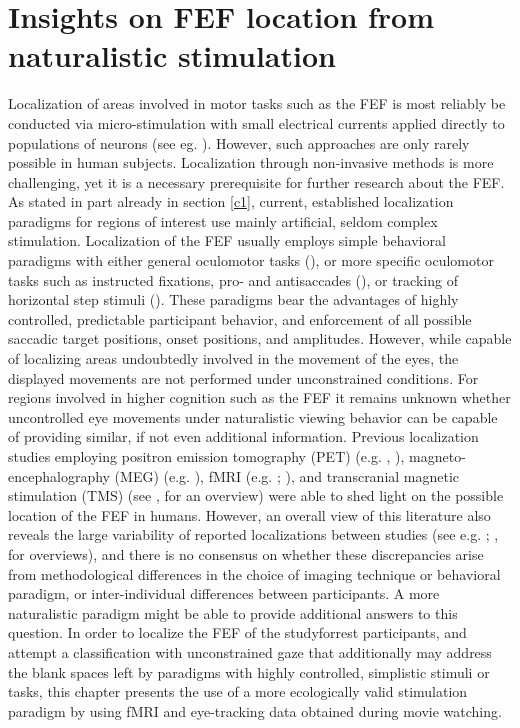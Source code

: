 \documentclass[a4paper, 12pt]{scrreprt}
\begin{document}
\section{Insights on FEF location from naturalistic stimulation}\label{section:shortcomings}
Localization of areas involved in motor tasks such as the FEF is most reliably be conducted via micro-stimulation with small electrical currents applied directly to populations of neurons (see eg. \cite{bruce1985primate}). However, such approaches are only rarely possible in human subjects. Localization through non-invasive methods is more challenging, yet it is a necessary prerequisite for further research about the FEF. As stated in part already in section \ref{c1}, current, established localization paradigms for regions of interest use mainly artificial, seldom complex stimulation. Localization of the FEF usually employs simple behavioral paradigms with either general oculomotor tasks (\cite{paus1996location}), or more specific oculomotor tasks such as instructed fixations, pro- and antisaccades (\cite{connolly2002human}), or tracking of horizontal step stimuli (\cite{alkan2011differentiation}). These paradigms bear the advantages of highly controlled, predictable participant behavior, and enforcement of all possible saccadic target positions, onset positions, and amplitudes. However, while capable of localizing areas undoubtedly involved in the movement of the eyes, the displayed movements are not performed under unconstrained conditions. For regions involved in higher cognition such as the FEF it remains unknown whether uncontrolled eye movements under naturalistic viewing behavior can be capable of providing similar, if not even additional information. Previous localization studies employing positron emission tomography (PET) (e.g. \textcite{paus1996location}, \cite{kawashima1998oculomotor}), magneto-encephalography (MEG) (e.g. \cite{ioannides2004meg}), fMRI (e.g. \cite{petit1999functional}; \cite{connolly2002human}), and transcranial magnetic stimulation (TMS) (see \textcite{vernet2014corrigendum}, for an overview) were able to shed light on the possible location of the FEF in humans. However, an overall view of this literature also reveals the large variability of reported localizations between studies (see e.g. \textcite{paus1996location}; \textcite{vernet2014corrigendum}, for overviews), and there is no consensus on whether these discrepancies arise from methodological differences in the choice of imaging technique or behavioral paradigm, or inter-individual differences between participants. A more naturalistic paradigm might be able to provide additional answers to this question. \newline
In order to localize the FEF of the studyforrest participants, and attempt a classification with unconstrained gaze that additionally may address the blank spaces left by paradigms with highly controlled, simplistic stimuli or tasks, this chapter presents the use of a more ecologically valid stimulation paradigm by using fMRI and eye-tracking data obtained during movie watching. 
\end{document}
